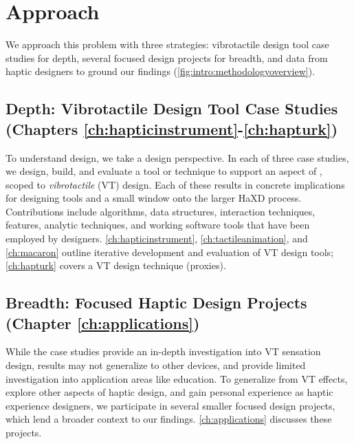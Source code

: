 \section{Approach}
We approach this problem with three strategies: vibrotactile design tool case studies for depth, several focused design projects for breadth, and data from haptic designers to ground our findings  (\autoref{fig:intro:methodologyoverview}).

\subsection{Depth: Vibrotactile Design Tool Case Studies (Chapters \ref{ch:hapticinstrument}-\ref{ch:hapturk})}
To understand design, we take a design perspective.
In each of three case studies, we design, build, and evaluate a tool or technique to support an aspect of \haxd, scoped to \emph{vibrotactile} (VT) design.
Each of these results in concrete implications for designing tools and a small window onto the larger HaXD process.
Contributions include algorithms, data structures, interaction techniques, features, analytic techniques, and working software tools that have been employed by designers.
\autoref{ch:hapticinstrument}, \autoref{ch:tactileanimation}, and \autoref{ch:macaron} outline iterative development and evaluation of VT design tools; \autoref{ch:hapturk} covers a VT design technique (proxies).

\subsection{Breadth: Focused Haptic Design Projects (Chapter \ref{ch:applications})}
While the case studies provide an in-depth investigation into VT sensation design, results may not generalize to other devices, and provide limited investigation into application areas like education.
To generalize from VT effects, explore other aspects of haptic design, and gain personal experience as haptic experience designers, we participate in several smaller focused design projects, which lend a broader context to our findings.
\autoref{ch:applications} discusses these projects.

